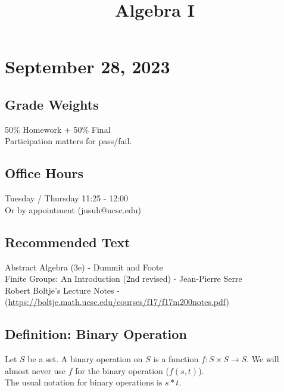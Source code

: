 \documentclass[11pt]{article}
\date{}
\title{Algebra I}
\newcommand{\0}{\emptyset}
\begin{document}
\maketitle
\section*{September 28, 2023}
\label{sec:org8e0eb3f}
\subsection*{Grade Weights}
\label{sec:org57d2b68}
50\% Homework + 50\% Final\\[0pt]
Participation matters for pass/fail.\\[0pt]
\subsection*{Office Hours}
\label{sec:org3985113}
Tuesday / Thursday 11:25 - 12:00\\[0pt]
Or by appointment (jusuh@ucsc.edu)\\[0pt]
\subsection*{Recommended Text}
\label{sec:orgb175f39}
Abstract Algebra (3e) - Dummit and Foote\\[0pt]
Finite Groups: An Introduction (2nd revised) - Jean-Pierre Serre\\[0pt]
Robert Boltje's Lecture Notes - (\url{https://boltje.math.ucsc.edu/courses/f17/f17m200notes.pdf})\\[0pt]
\subsection*{Definition: Binary Operation}
\label{sec:org4642ba0}
Let \(S\) be a set. A binary operation on \(S\) is a function \(f:S\times S\to S\). We will almost never use \(f\) for the binary operation (\(f(s,t)\)).\\[0pt]
The usual notation for binary operations is \(s*t\).\\[0pt]
\end{document}
